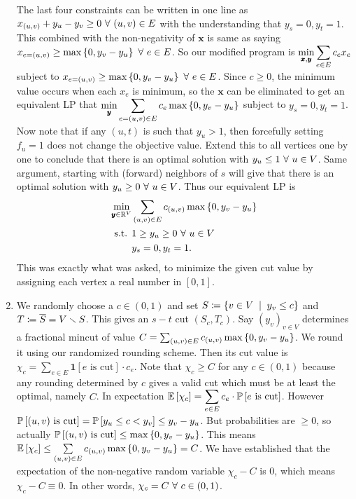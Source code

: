 \begin{enumerate}[label=(\alph*)]
The last four constraints can be written in one line as $x_{(u,v)}+y_{u}-y_{v}\ge 0\fa (u,v)\in E$ with the understanding that $y_{s}=0,y_{t}=1$. This combined with the non-negativity of $\pmb x$ is same as saying $x_{e=(u,v)}\ge \max\set{0,y_{v}-y_{u}}\fa e\in E$. So our modified program is $\ds\min_{\pmb x,\pmb y} \sum_{e\in E}c_{e}x_{e}$ subject to $\ds x_{e=(u,v)}\ge \max\set{0,y_{v}-y_{u}}\fa e\in E$. Since $c\ge 0$, the minimum value occurs when each $x_{e}$ is minimum, so the $\pmb x$ can be eliminated to get an equivalent LP that $\ds\min_{\pmb y}\sum\limits_{e=(u,v)\in E}c_{e}\max\set{0,y_{v}-y_{u}}$ subject to $y_{s}=0,y_{t}=1$. Now note that if any $(u,t)$ is such that $y_{u}>1$, then forcefully setting $f_{u}=1$ does not change the objective value. Extend this to all vertices one by one to conclude that there is an optimal solution with $y_{u}\le 1\fa u\in V$. Same argument, starting with (forward) neighbors of $s$ will give that there is an optimal solution with $y_{u}\ge 0\fa u\in V$. Thus our equivalent LP is \begin{equation}\label{mincut}\begin{aligned}
\min_{\pmb y\in \R^{V}} &\sum\limits_{(u,v)\in E}c_{(u,v)}\max\set{0,y_{v}-y_{u}}\\
\text{s.t. }& 1\ge y_{u}\ge 0\fa u\in V\\
& y_{s}=0, y_{t}=1.
\end{aligned}\end{equation}
This was exactly what was asked, to minimize the given cut value by assigning each vertex a real number in $[0,1]$.
\item We randomly choose a $c\in (0,1)$ and set $S\sett \set{v\in V\st y_{v}\le c}$ and $T\sett \overline S = V\smallsetminus S$. This gives an $s-t$ cut $(S_{c},T_{c})$. Say $(y_{v})_{v\in V}$ determines a fractional mincut of value $C = \sum_{(u,v)\in E}c_{(u,v)}\max\set{0,y_{v}-y_{u}}$. We round it using our randomized rounding scheme. Then its cut value is $\chi_{c}=\sum\limits_{e\in E}\pmb 1[e \text{ is cut}]\cdot c_{e}$. Note that $\chi_{c}\ge C$ for any $c\in (0,1)$ because any rounding determined by $c$ gives a valid cut which must be at least the optimal, namely $C$. In expectation $\ds\E{\chi_{c}} = \sum\limits_{e\in E}c_{e}\cdot \P{e \text{ is cut}}$. However $\P{(u,v) \text{ is cut}} = \P{y_{u}\le c < y_{v}} \le y_{v}-y_{u}$. But probabilities are $\ge 0$, so actually $\P{(u,v) \text{ is cut}} \le \max\set{0,y_{v}-y_{u}}$. This means $\E{\chi_{c}} \le \sum\limits_{(u,v)\in E}c_{(u,v)}\max\set{0,y_{v}-y_{u}} = C$. We have established that the expectation of the non-negative random variable $\chi_{c}-C$ is $0$, which means $\chi_{c}-C\equiv 0$. In other words, $\chi_{c}=C\fa c\in (0,1)$. 


\end{enumerate}
